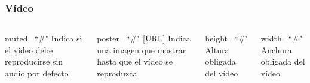 \documentclass{beamer}
\begin{document}
\begin{frame}[fragile]
\frametitle{Vídeo}
	\begin{columns}[c]
	\begin{block}{muted=``\#"}
	Indica si el vídeo debe reproducirse sin audio por defecto
	\end{block}
	\pause
	\begin{block}{poster=``\#" [URL]}
	Indica una imagen que mostrar hasta que el vídeo se reproduzca
	\end{block}
	\pause
	\begin{block}{height=``\#"}
	Altura obligada del vídeo
	\end{block}
	\pause
	\begin{block}{width=``\#"}
	Anchura obligada del vídeo
	\end{block}
	\end{columns}
\end{frame}	
\end{document}

